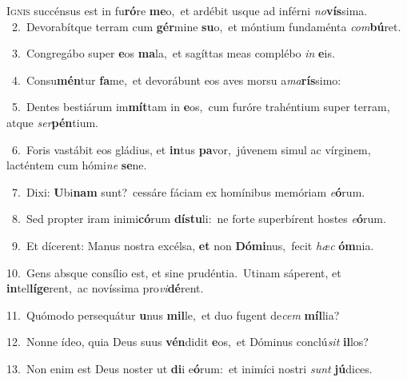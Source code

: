 \lettrine{\initial\textcolor{\initialcolor}{I}}{gnis} succénsus est in fu\-\textbf{ró}\-re \textbf{me}\-o,~\star et ardébit usque ad inférni \textit{no}\-\textbf{vís}sima.\\
{\numbfont\textcolor{\numbcolor}{~2.}}~Devorabítque terram cum \textbf{gér}\-mine \textbf{su}\-o,~\star et móntium fundaménta \textit{com}\-\textbf{bú}ret.\par
{\numbfont\textcolor{\numbcolor}{~3.}}~Congregábo super \textbf{e}\-os \textbf{ma}\-la,~\star et sagíttas meas complébo \textit{in} \textbf{e}\-is.\par
{\numbfont\textcolor{\numbcolor}{~4.}}~Consu\-\textbf{mén}\-tur \textbf{fa}\-me,~\star et devorábunt eos aves morsu a\-\textit{ma}\-\textbf{rís}simo:\par
{\numbfont\textcolor{\numbcolor}{~5.}}~Dentes bestiárum im\-\textbf{mít}\-tam in \textbf{e}\-os,~\star cum furóre trahéntium super terram, atque \textit{ser}\-\textbf{pén}tium.\par
{\numbfont\textcolor{\numbcolor}{~6.}}~Foris vastábit eos gládius, et \textbf{in}\-tus \textbf{pa}\-vor,~\star júvenem simul ac vírginem, lacténtem cum hómi\textit{ne} \textbf{se}\-ne.\par
{\numbfont\textcolor{\numbcolor}{~7.}}~Dixi: \textbf{U}\-bi\textbf{nam} sunt?~\star cessáre fáciam ex homínibus memóriam \textit{e}\-\textbf{ó}rum.\par
{\numbfont\textcolor{\numbcolor}{~8.}}~Sed propter iram inimi\-\textbf{có}\-rum \textbf{dís}\-\textbf{tu}li:~\star ne forte superbírent hostes \textit{e}\-\textbf{ó}rum.\par
{\numbfont\textcolor{\numbcolor}{~9.}}~Et dícerent: Manus nostra excélsa, \textbf{et} non \textbf{Dó}\-\textbf{mi}nus,~\star fecit \textit{hæc} \textbf{óm}\-nia.\par
{\numbfont\textcolor{\numbcolor}{10.}}~Gens absque consílio est, et sine prudéntia.~\dagger Utinam sáperent, et \textbf{in}\-tel\-\textbf{lí}\-\textbf{ge}rent,~\star ac novíssima pro\-\textit{vi}\-\textbf{dé}rent.\par
{\numbfont\textcolor{\numbcolor}{11.}}~Quómodo persequátur \textbf{u}\-nus \textbf{mil}\-le,~\star et duo fugent de\textit{cem} \textbf{míl}\-lia?\par
{\numbfont\textcolor{\numbcolor}{12.}}~Nonne ídeo, quia Deus suus \textbf{vén}\-didit \textbf{e}\-os,~\star et Dóminus conclú\textit{sit} \textbf{il}\-los?\par
{\numbfont\textcolor{\numbcolor}{13.}}~Non enim est Deus noster ut \textbf{di}\-i e\-\textbf{ó}\-rum:~\star et inimíci nostri \textit{sunt} \textbf{jú}\-dices.\par
